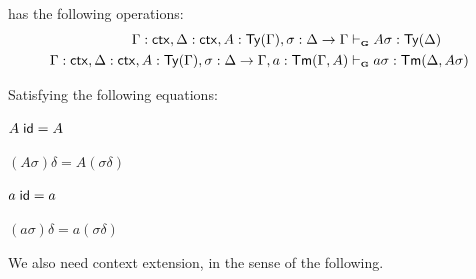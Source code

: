 \begin{definition}
    \ThyGAT has the following operations:
    \begin{align*}
    \Gamma : \ctx, \Delta : \ctx, A : \Type(\Gamma), \sigma : \Delta \rightarrow \Gamma &\vdashG A \sigma : \Type(\Delta)\\
    \Gamma : \ctx, \Delta : \ctx, A : \Type(\Gamma), \sigma : \Delta \rightarrow \Gamma, a: \Elem(\Gamma,A) &\vdashG a \sigma : \Elem(\Delta, A\sigma)
    \end{align*}

    Satisfying the following equations:

    \begin{minipage}{0.20\linewidth}
        $A \; \mathsf{id} = A$
    \end{minipage}
    \hfill
    \begin{minipage}{0.20\linewidth}
        $(A\sigma)\delta = A(\sigma \delta)$
    \end{minipage}
    \hfill
    \begin{minipage}{0.20\linewidth}
        $a \; \mathsf{id} = a$
    \end{minipage}
    \hfill
    \begin{minipage}{0.20\linewidth}
        $(a\sigma)\delta = a (\sigma \delta)$
    \end{minipage}

\end{definition}

We also need context extension, in the sense of the following.

